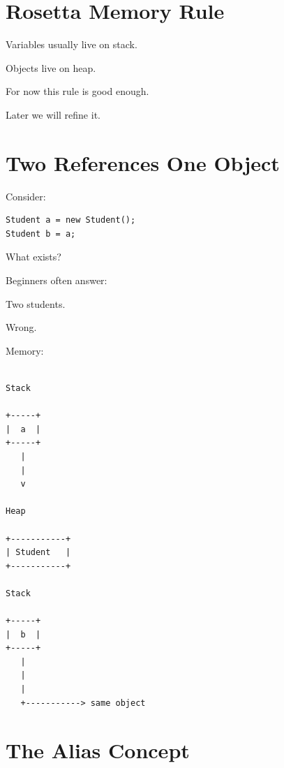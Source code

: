 \documentclass[11pt,a4paper]{book}
\begin{document}
\section{Rosetta Memory Rule}

\begin{rosettarule}

Variables usually live on stack.

Objects live on heap.

\end{rosettarule}

For now this rule is good enough.

Later we will refine it.


\section{Two References One Object}

Consider:

\begin{verbatim}
Student a = new Student();
Student b = a;
\end{verbatim}

What exists?

Beginners often answer:

Two students.

Wrong.


Memory:

\begin{verbatim}

Stack

+-----+
|  a  |
+-----+
   |
   |
   v

Heap

+-----------+
| Student   |
+-----------+

Stack

+-----+
|  b  |
+-----+
   |
   |
   |
   +-----------> same object

\end{verbatim}


\section{The Alias Concept}
\end{document}
